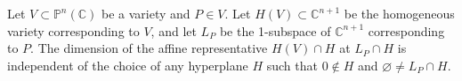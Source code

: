 Let $V \subset \mathbb{P}^n(\mathbb{C})$ be a variety and $P \in V$. Let $H(V) \subset \mathbb{C}^{n+1}$ be the homogeneous variety corresponding to $V$, and let $L_P$ be the 1-subspace of $\mathbb{C}^{n+1}$ corresponding to $P$. The dimension of the affine representative $H(V) \cap H$ at $L_P \cap H$ is independent of the choice of any hyperplane $H$ such that $0 \notin H$ and $\varnothing \neq L_P \cap H$.
